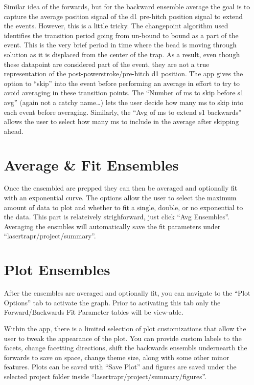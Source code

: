 \documentclass[
]{book}
\begin{document}
Similar idea of the forwards, but for the backward ensemble average the goal is to capture the average position signal of the d1 pre-hitch position signal to extend the events. However, this is a little tricky. The changepoint algorithm used identifies the transition period going from un-bound to bound as a part of the event. This is the very brief period in time where the bead is moving through solution as it is displaced from the center of the trap. As a result, even though these datapoint are considered part of the event, they are not a true representation of the post-powerstroke/pre-hitch d1 position. The app gives the option to ``skip'' into the event before performing an average in effort to try to avoid averaging in these transition points. The ``Number of ms to skip before s1 avg'' (again not a catchy name\ldots) lets the user decide how many ms to skip into each event before averaging. Similarly, the ``Avg of ms to extend s1 backwards'' allows the user to select how many ms to include in the average after skipping ahead.

\section{Average \& Fit Ensembles}\label{average-fit-ensembles}

Once the ensembled are prepped they can then be averaged and optionally fit with an exponential curve. The options allow the user to select the maximum amount of data to plot and whether to fit a single, double, or no exponential to the data. This part is relateively strighforward, just click ``Avg Ensembles''. Averaging the ensmbles will automatically save the fit parameters under ``lasertrapr/project/summary''.

\section{Plot Ensembles}\label{plot-ensembles}

After the ensembles are averaged and optionally fit, you can navigate to the ``Plot Options'' tab to activate the graph. Prior to activating this tab only the Forward/Backwards Fit Parameter tables will be view-able.

Within the app, there is a limited selection of plot customizations that allow the user to tweak the appearance of the plot. You can provide custom labels to the facets, change facetting directions, shift the backwards ensembls undernearth the forwards to save on space, change theme size, along with some other minor features. Plots can be saved with ``Save Plot'' and figures are saved under the selected project folder inside ``lasertrapr/project/summary/figures''.
\end{document}
